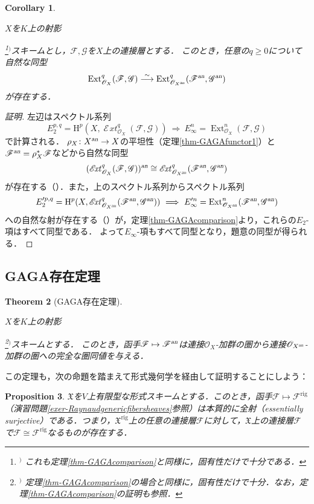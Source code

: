 \documentclass[a4paper,12pt, dvipdfmx]{jsbook}
\def\O{\mathscr{O}}
\def\rig{\mathop{\mathrm{rig}}\nolimits}
\def\Ext{\mathop{\mathrm{Ext}}\nolimits}
\def\lExt{\mathop{\mathscr{E}\!\mathit{xt}}\nolimits}
\def\H{\mathrm{H}}
\def\an{\textsl{an}}
\theoremstyle{plain}
\newtheorem{thm}{\bfseries Theorem}[section]
\newtheorem{prop}[thm]{\bfseries Proposition}
\newtheorem{cor}[thm]{\bfseries Corollary}
\theoremstyle{definition}
\newcounter{chushaku}
\def\chu#1{\addtocounter{chushaku}{1}\footnote[\value{chushaku}]{${}^)$ #1}${}^)$}
\begin{document}
\begin{cor}\label{cor-GAGAcomparison}{\rm 
$X$を$K$上の射影\chu{これも定理\ref{thm-GAGAcomparison}と同様に，固有性だけで十分である．}スキームとし，$\mathscr{F},\mathscr{G}$を$X$上の連接層とする．
このとき，任意の$q\geq 0$について自然な同型
$$
\Ext^q_{\O_X}(\mathscr{F},\mathscr{G})\stackrel{\sim}{\longrightarrow}\Ext^q_{\O_{X^{\an}}}(\mathscr{F}^{\an},\mathscr{G}^{\an})
$$
が存在する．}
\end{cor}

\begin{proof}[証明]
左辺はスペクトル系列
$$
E^{p,q}_2=\H^p(X,\lExt^q_{\O_X}(\mathscr{F},\mathscr{G}))\ \Longrightarrow\ E^n_{\infty}=\Ext^n_{\O_X}(\mathscr{F},\mathscr{G})
$$
で計算される．
$\rho_X\colon X^{\an}\rightarrow X$の平坦性（定理\ref{thm-GAGAfunctor1}）と$\mathscr{F}^{\an}=\rho^{\ast}_X\mathscr{F}$などから自然な同型
$$
(\lExt^q_{\O_X}(\mathscr{F},\mathscr{G}))^{\an}\cong\lExt^q_{\O_{X^{\an}}}(\mathscr{F}^{\an},\mathscr{G}^{\an})
$$
が存在する（\cite[$\mathbf{0}_{\mathbf{III}}$, (12.3.4) (i)]{EGA}）．また，上のスペクトル系列からスペクトル系列
$$
E^{\prime p,q}_2=\H^p(X,\lExt^q_{\O_{X^{\an}}}(\mathscr{F}^{\an},\mathscr{G}^{\an}))\ \Longrightarrow\ E^{\prime n}_{\infty}=\Ext^n_{\O_{X^{\an}}}(\mathscr{F}^{\an},\mathscr{G}^{\an})
$$
への自然な射が存在する（\cite[$\mathbf{0}_{\mathbf{III}}$, (12.3.4) (ii)]{EGA}）が，定理\ref{thm-GAGAcomparison}より，これらの$E_2$-項はすべて同型である．
よって$E_{\infty}$-項もすべて同型となり，題意の同型が得られる．
\end{proof}

\subsection{GAGA存在定理}\label{sub-GAGAexistence}
\begin{thm}[GAGA存在定理]\label{thm-GAGAexistence}{\rm 
$X$を$K$上の射影\chu{定理\ref{thm-GAGAcomparison}の場合と同様に，固有性だけで十分．なお，定理\ref{thm-GAGAcomparison}の証明も参照．}スキームとする．
このとき，函手$\mathscr{F}\mapsto\mathscr{F}^{\an}$は連接$\O_X$-加群の圏から連接$\O_{X^{\an}}$-加群の圏への完全な圏同値を与える．}
\end{thm}

この定理も，次の命題を踏まえて形式幾何学を経由して証明することにしよう：
\begin{prop}\label{prop-GAGAexistence}{\rm 
$\mathfrak{X}$を$V$上有限型な形式スキームとする．このとき，函手$\mathscr{F}\mapsto\mathscr{F}^{\rig}$（演習問題\ref{exer-Raynaudgenericfibersheaves}参照）は本質的に全射（essentially surjective）である．つまり，$\mathfrak{X}^{\rig}$上の任意の連接層$\mathcal{F}$に対して，$\mathfrak{X}$上の連接層$\mathscr{F}$で$\mathcal{F}\cong\mathscr{F}^{\rig}$なるものが存在する．}
\end{prop}
\end{document}
